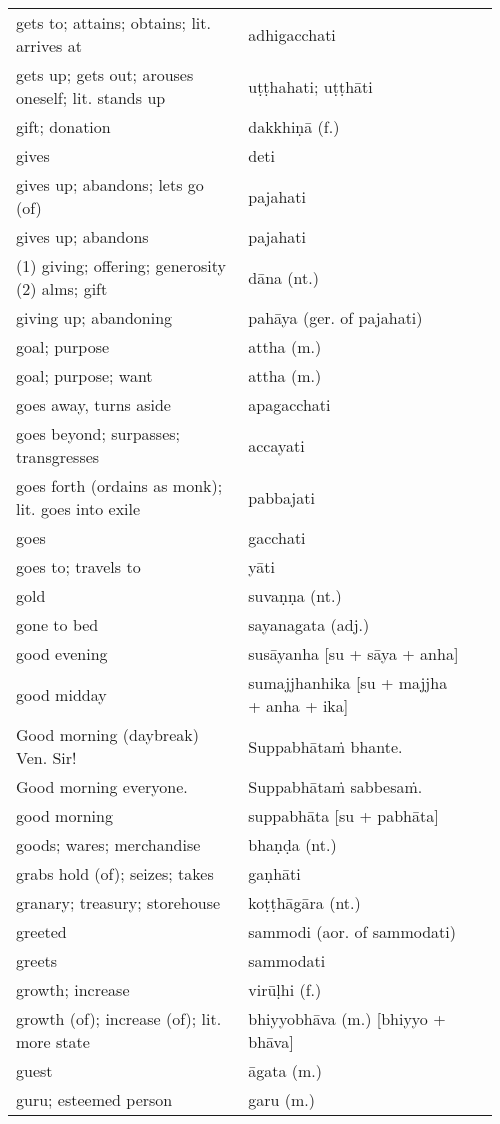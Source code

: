 \documentclass[a5paper]{memoir}
\begin{document}
\begin{longtable}{L{0.48\linewidth} L{0.48\linewidth} H}
gets to; attains; obtains; lit. arrives at & adhigacchati & \\
gets up; gets out; arouses oneself; lit. stands up & uṭṭhahati; uṭṭhāti & \\
gift; donation & dakkhiṇā (f.) & \\
gives & deti & \\
gives up; abandons; lets go (of) & pajahati & \\
gives up; abandons & pajahati & \\
(1) giving; offering; generosity (2) alms; gift & dāna (nt.) & \\
giving up; abandoning & pahāya (ger. of pajahati) & \\
goal; purpose & attha (m.) & \\
goal; purpose; want & attha (m.) & \\
goes away, turns aside & apagacchati & \\
goes beyond; surpasses; transgresses & accayati & \\
goes forth (ordains as monk); lit. goes into exile & pabbajati & \\
goes & gacchati & \\
goes to; travels to & yāti & \\
gold & suvaṇṇa (nt.) & \\
gone to bed & sayanagata (adj.) & \\
good evening & susāyanha [su + sāya + anha] & \\
good midday & sumajjhanhika [su + majjha + anha + ika] & \\
Good morning (daybreak) Ven. Sir! & Suppabhātaṁ bhante. & \\
Good morning everyone. & Suppabhātaṁ sabbesaṁ. & \\
good morning & suppabhāta [su + pabhāta] & \\
goods; wares; merchandise & bhaṇḍa (nt.) & \\
grabs hold (of); seizes; takes & gaṇhāti & \\
granary; treasury; storehouse & koṭṭhāgāra (nt.) & \\
greeted & sammodi (aor. of sammodati) & \\
greets & sammodati & \\
growth; increase & virūḷhi (f.) & \\
growth (of); increase (of); lit. more state & bhiyyobhāva (m.) [bhiyyo + bhāva] & \\
guest & āgata (m.) & \\
guru; esteemed person & garu (m.) & \\

\end{longtable}
\end{document}
